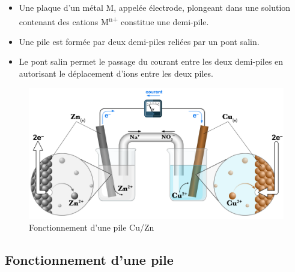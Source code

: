 \documentclass[
  11pt,
  french,
  a4paper,
  openany]{book}
\providecommand{\tightlist}{%
  \setlength{\itemsep}{0pt}\setlength{\parskip}{0pt}}
\begin{document}
\begin{itemize}
\tightlist
\item
  Une plaque d'un métal M, appelée électrode, plongeant dans une solution contenant des cations M\textsuperscript{n+} constitue une demi-pile.
\item
  Une pile est formée par deux demi-piles reliées par un pont salin.
\item
  Le pont salin permet le passage du courant entre les deux demi-piles en autorisant le déplacement d'ions entre les deux piles.
\end{itemize}

\begin{figure}

{\centering \includegraphics[width=0.9\linewidth]{images/pile-electrique} 

}

\caption{Fonctionnement d’une pile Cu/Zn}\label{fig:pile-electrique}
\end{figure}
\clearpage

\hypertarget{fonctionnement-dune-pile}{%
\subsection{Fonctionnement d'une pile}\label{fonctionnement-dune-pile}}
\end{document}
